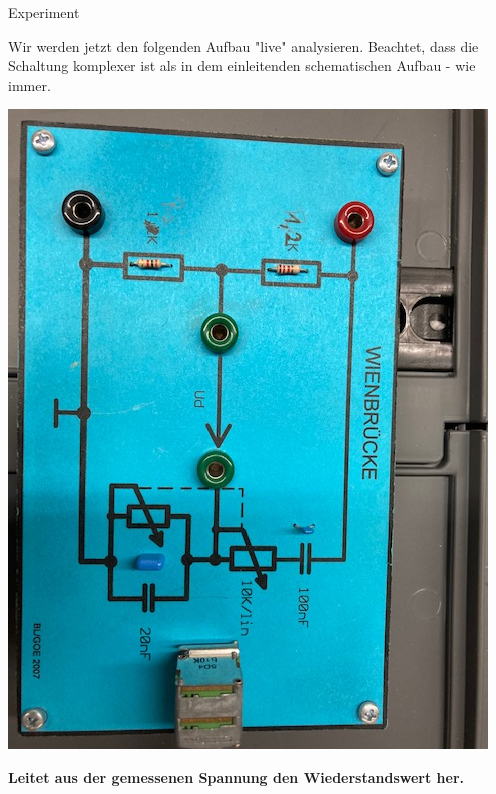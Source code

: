 \begin{frame}[t]{Experiment}

Wir werden jetzt den folgenden Aufbau "live" analysieren. Beachtet, dass die Schaltung komplexer ist als in dem einleitenden schematischen Aufbau - wie immer.

\begin{spacing}{0.9} \begin{tiny}
    \begin{minipage}{\textwidth}
      \includegraphics[width=0.5\linewidth]{pictures/wheatstone_bridge.jpg}
    \end{minipage}
\end{tiny} \end{spacing}

\textbf{Leitet aus der gemessenen Spannung den Wiederstandswert her.}

\end{frame}
